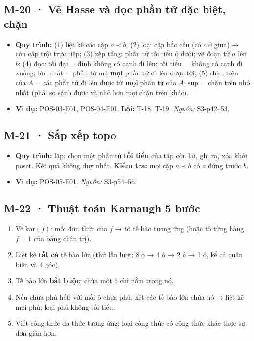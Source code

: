 \documentclass[
  10pt,
  twoside,openany]{book}
\providecommand{\tightlist}{%
  \setlength{\itemsep}{0pt}\setlength{\parskip}{0pt}}
\begin{document}
\hypertarget{M-20}{%
\subsection{M-20 · Vẽ Hasse và đọc phần tử đặc biệt, chặn}\label{M-20}}

\begin{itemize}
\tightlist
\item
  \textbf{Quy trình:} (1) liệt kê các cặp \(a\prec b\); (2) loại cặp bắc
  cầu (có \(c\) ở giữa) → còn cặp trội trực tiếp; (3) xếp tầng: phần tử
  tối tiểu ở dưới; vẽ đoạn từ \(a\) lên \(b\); (4) đọc: tối đại = đỉnh
  không có cạnh đi lên; tối tiểu = không có cạnh đi xuống; lớn nhất =
  phần tử mà \textbf{mọi} phần tử đi lên được tới; (5) chặn trên của
  \(A\) = các phần tử đi lên được từ \textbf{mọi} phần tử của \(A\); sup
  = chặn trên nhỏ nhất (phải so sánh được và nhỏ hơn mọi chặn trên
  khác).
\item
  \textbf{Ví dụ:} \protect\hyperlink{POS-03-E01}{POS-03-E01},
  \protect\hyperlink{POS-04-E01}{POS-04-E01}. \textbf{Lỗi:}
  \protect\hyperlink{T-18}{T-18}, \protect\hyperlink{T-19}{T-19}.
  \emph{Nguồn:} S3-p42--53.
\end{itemize}

\hypertarget{M-21}{%
\subsection{M-21 · Sắp xếp topo}\label{M-21}}

\begin{itemize}
\tightlist
\item
  \textbf{Quy trình:} lặp: chọn một phần tử \textbf{tối tiểu} của tập
  còn lại, ghi ra, xóa khỏi poset. Kết quả không duy nhất. \textbf{Kiểm
  tra:} mọi cặp \(a\prec b\) có \(a\) đứng trước \(b\).
\item
  \textbf{Ví dụ:} \protect\hyperlink{POS-05-E01}{POS-05-E01}.
  \emph{Nguồn:} S3-p54--56.
\end{itemize}

\hypertarget{M-22}{%
\subsection{M-22 · Thuật toán Karnaugh 5 bước}\label{M-22}}

\begin{enumerate}
\def\labelenumi{\arabic{enumi}.}
\tightlist
\item
  Vẽ \(\mathrm{kar}(f)\): mỗi đơn thức của \(f\) → tô tế bào tương ứng
  (hoặc tô từng hàng \(f=1\) của bảng chân trị).
\item
  Liệt kê \textbf{tất cả} tế bào lớn (thử lần lượt: 8 ô → 4 ô → 2 ô → 1
  ô, kể cả quấn biên và 4 góc).
\item
  Tế bào lớn \textbf{bắt buộc}: chứa một ô chỉ nằm trong nó.
\item
  Nếu chưa phủ hết: với mỗi ô chưa phủ, xét các tế bào lớn chứa nó →
  liệt kê mọi phủ; loại phủ không tối tiểu.
\item
  Viết công thức đa thức tương ứng; loại công thức có công thức khác
  thực sự đơn giản hơn.
\end{enumerate}
\end{document}
